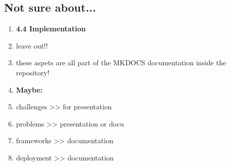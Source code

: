 \subsection{Not sure about...}

	\begin{enumerate}

	\item \textbf{4.4 Implementation}
		\item leave out!!
		\item these aspets are all part of the MKDOCS documentation inside the repository!

	\item \textbf{Maybe:}
		\item challenges		>> for presentation
		\item problems		>> presentation or docu
		\item frameworks 		>> documentation
		\item deployment		>> documentation

	\end{enumerate}
